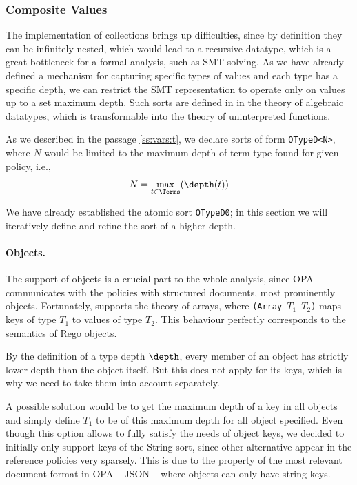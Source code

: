 \subsubsection{Composite Values}

The implementation of collections brings up difficulties, since by definition they can be infinitely nested, which would lead to a recursive datatype, which is a great bottleneck for a formal analysis, such as SMT solving.
As we have already defined a mechanism for capturing specific types of values and each type has a specific depth, we can restrict the SMT representation to operate only on values up to a set maximum depth.
Such sorts are defined in \smtlib in the theory of algebraic datatypes, which is transformable into the theory of uninterpreted functions.

As we described in the passage \ref{ss:vars:t}, we declare sorts of form \texttt{OTypeD<N>}, where $N$ would be limited to the maximum depth of term type found for given policy, i.e.,
$$ N = \max_{t \in \Terms}(\depth(t)) $$

We have already established the atomic sort \texttt{OTypeD0}; in this section we will iteratively define and refine the sort of a higher depth.

\paragraph{Objects.}
The support of objects is a crucial part to the whole analysis, since OPA communicates with the policies with structured documents, most prominently objects.
Fortunately, \smtlib supports the theory of arrays, where \texttt{(Array $T_1$ $T_2$)} maps keys of type $T_1$ to values of type $T_2$.
This behaviour perfectly corresponds to the semantics of Rego objects.

By the definition of a type depth $\depth$, every member of an object has strictly lower depth than the object itself.
But this does not apply for its keys, which is why we need to take them into account separately.

A possible solution would be to get the maximum depth of a key in all objects and simply define $T_1$ to be of this maximum depth for all object specified.
Even though this option allows to fully satisfy the needs of object keys, we decided to initially only support keys of the String sort, since other alternative appear in the reference policies very sparsely.
This is due to the property of the most relevant document format in OPA -- JSON -- where objects can only have string keys.

